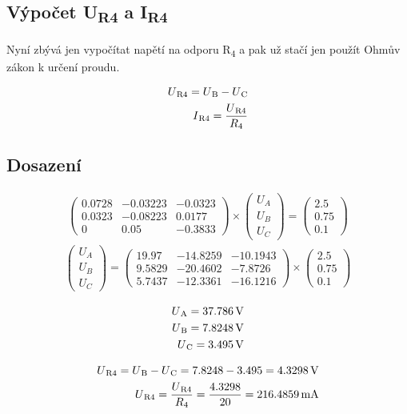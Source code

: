 \subsection{Výpočet U\textsubscript{R4} a I\textsubscript{R4}}
Nyní zbývá jen vypočítat napětí na odporu R\textsubscript{4} a pak už stačí jen použít Ohmův zákon k určení proudu.

\begin{align*}
    U\textsubscript{R4} = U\textsubscript{B} - U\textsubscript{C} \\
    I\textsubscript{R4} = \frac{U\textsubscript{R4}}{R\textsubscript{4}}
\end{align*}

\subsection{Dosazení}
\begin{figure}[H]
\begin{align*}
\begin{pmatrix}
	0.0728&-0.03223&-0.0323\\
	0.0323&-0.08223&0.0177\\
	0&0.05&-0.3833
\end{pmatrix}\times 
\begin{pmatrix}
	U_A\\
	U_B\\
	U_C
\end{pmatrix}=
\begin{pmatrix}
	2.5\\
	0.75\\
	0.1
\end{pmatrix}
\end{align*}
\begin{align*}
\begin{pmatrix}
	U_A\\
	U_B\\
	U_C
\end{pmatrix}=
\begin{pmatrix}
	19.97&-14.8259&-10.1943\\
	9.5829&-20.4602&-7.8726\\
	5.7437&-12.3361&-16.1216
\end{pmatrix}\times
\begin{pmatrix}
	2.5\\
	0.75\\
	0.1
\end{pmatrix}
\end{align*}
\end{figure}

\begin{align*}
    U\textsubscript{A} = \SI{37.786}{\volt} \\
    U\textsubscript{B} = \SI{7.8248}{\volt} \\
    U\textsubscript{C} = \SI{3.495}{\volt}
\end{align*}

\begin{align*}
    U\textsubscript{R4} = U\textsubscript{B} - U\textsubscript{C} = 7.8248 - 3.495 = \SI{4.3298}{\volt} \\
    U\textsubscript{R4} = \frac{U\textsubscript{R4}}{R\textsubscript{4}} = \frac{4.3298}{20} = \SI{216.4859}{\milli\ampere}
\end{align*}